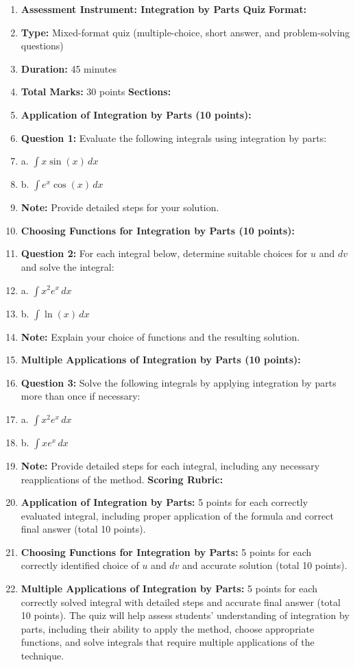 \begin{enumerate}
    \item \textbf{Assessment Instrument: Integration by Parts Quiz} \textbf{Format:}
    \item \textbf{Type:} Mixed-format quiz (multiple-choice, short answer, and problem-solving questions)
    \item \textbf{Duration:} 45 minutes
    \item \textbf{Total Marks:} 30 points \textbf{Sections:}
    \item \textbf{Application of Integration by Parts (10 points):}
    \item \textbf{Question 1:} Evaluate the following integrals using integration by parts:
    \item a. $\int x \sin(x) \, dx$
    \item b. $\int e^x \cos(x) \, dx$
    \item \textbf{Note:} Provide detailed steps for your solution.
    \item \textbf{Choosing Functions for Integration by Parts (10 points):}
    \item \textbf{Question 2:} For each integral below, determine suitable choices for $u$ and $dv$ and solve the integral:
    \item a. $\int x^2 e^x \, dx$
    \item b. $\int \ln(x) \, dx$
    \item \textbf{Note:} Explain your choice of functions and the resulting solution.
    \item \textbf{Multiple Applications of Integration by Parts (10 points):}
    \item \textbf{Question 3:} Solve the following integrals by applying integration by parts more than once if necessary:
    \item a. $\int x^2 e^x \, dx$
    \item b. $\int x e^x \, dx$
    \item \textbf{Note:} Provide detailed steps for each integral, including any necessary reapplications of the method. \textbf{Scoring Rubric:}
    \item \textbf{Application of Integration by Parts:} 5 points for each correctly evaluated integral, including proper application of the formula and correct final answer (total 10 points).
    \item \textbf{Choosing Functions for Integration by Parts:} 5 points for each correctly identified choice of $u$ and $dv$ and accurate solution (total 10 points).
    \item \textbf{Multiple Applications of Integration by Parts:} 5 points for each correctly solved integral with detailed steps and accurate final answer (total 10 points). The quiz will help assess students' understanding of integration by parts, including their ability to apply the method, choose appropriate functions, and solve integrals that require multiple applications of the technique.
\end{enumerate}

